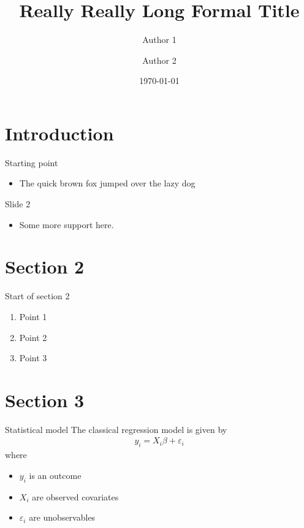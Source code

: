 \documentclass[english,aspectratio=169,12pt,xcolor=dvipsnames]{beamer}
\title[Short Title]{Really Really Long Formal Title}
\author[A1 LN \& A2 LN]{Author 1 \and Author 2}
\institute[Affil1 \& Affil2]{Affil1 \& Affil2}
\date{\today}
\begin{document}
\begin{frame}[plain]
\titlepage
\end{frame}

\section{Introduction}
\begin{frame}{Starting point}
\begin{itemize}
	\item The \alert{quick} brown fox jumped over the lazy dog
\end{itemize}
\end{frame}

\begin{frame}{Slide 2}
\begin{itemize}
	\item Some more support here.
\end{itemize}
\end{frame}


\section{Section 2}
\begin{frame}{Start of section 2}
\begin{enumerate}
	\item Point 1
	\item Point 2
	\item Point 3
\end{enumerate}
\end{frame}


\section{Section 3}
\begin{frame}{Statistical model}
The classical regression model is given by
\begin{align*}
y_{i} = X_{i}\beta + \varepsilon_{i}
\end{align*}
where
\begin{itemize}
	\item $y_{i}$ is an outcome
	\item $X_{i}$ are observed covariates
	\item $\varepsilon_{i}$ are unobservables
\end{itemize}
\end{frame}
\end{document}
